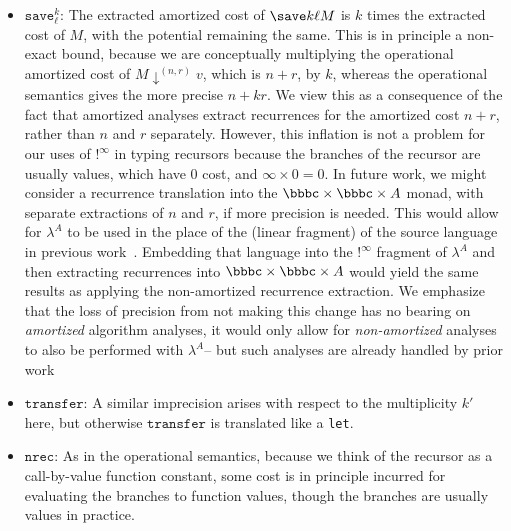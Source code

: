 \begin{itemize}
  \item $\texttt{save}^k_\ell$: The extracted amortized cost of $\save k
    \ell M$ is $k$ times the extracted cost of $M$, with the potential
    remaining the same.  This is in principle a non-exact bound, because we
    are conceptually multiplying the operational amortized cost of $M
    \downarrow^{(n,r)} v$, which is $n + r$, by $k$, whereas the
    operational semantics gives the more precise $n + k r$.  We view
    this as a consequence of the fact that amortized analyses extract
    recurrences for the amortized cost $n+r$, rather than $n$ and $r$
    separately. However, this inflation is not a
    problem for our uses of $!^\infty$ in typing recursors because the
    branches of the recursor are usually values, which have 0 cost, and
    $\infty \times 0 = 0$. In future work, we might consider a recurrence
    translation into the $\bbbc \times \bbbc \times A$ monad, with
    separate extractions of $n$ and $r$, if more precision is needed.
    This would allow for $\lambda^A$ to be used in the place of the
    (linear fragment) of the source language in previous 
    work~\cite{danner-et-al:icfp15}. Embedding that language into the $!^\infty$
    fragment of $\lambda^A$ and then extracting recurrences into 
    $\bbbc \times \bbbc \times A$ would yield the same results as
    applying the non-amortized recurrence extraction. We emphasize
    that the loss of precision from not making this change has no bearing
    on \textit{amortized} algorithm analyses, it would only
    allow for \textit{non-amortized} analyses to also be performed
    with $\lambda^A$-- but such analyses are already handled by prior work \cite{danner-et-al:icfp15,kavvos-et-al:popl20}
    
  \item $\texttt{transfer}$: A similar imprecision arises with respect
    to the multiplicity $k'$ here, but otherwise $\texttt{transfer}$ is
    translated like a \texttt{let}.  

% 
% 
  \item $\texttt{nrec}$: As in the operational semantics, because we
    think of the recursor as a call-by-value function constant, some
    cost is in principle incurred for evaluating the branches to
    function values, though the branches are usually values in practice.


\end{itemize}
